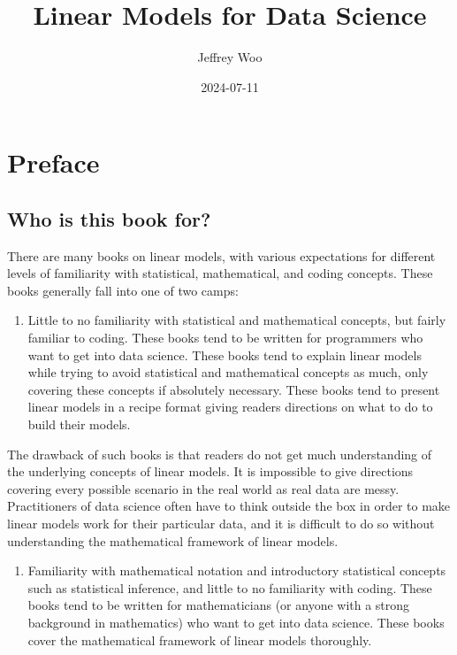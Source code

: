 \documentclass[
]{book}
\title{Linear Models for Data Science}
\author{Jeffrey Woo}
\date{2024-07-11}
\providecommand{\tightlist}{%
  \setlength{\itemsep}{0pt}\setlength{\parskip}{0pt}}
\begin{document}
\maketitle

{
\setcounter{tocdepth}{1}
\tableofcontents
}
\hypertarget{preface}{%
\chapter*{Preface}\label{preface}}

\hypertarget{who-is-this-book-for}{%
\section*{Who is this book for?}\label{who-is-this-book-for}}

There are many books on linear models, with various expectations for different levels of familiarity with statistical, mathematical, and coding concepts. These books generally fall into one of two camps:

\begin{enumerate}
\def\labelenumi{\arabic{enumi}.}
\tightlist
\item
  Little to no familiarity with statistical and mathematical concepts, but fairly familiar to coding. These books tend to be written for programmers who want to get into data science. These books tend to explain linear models while trying to avoid statistical and mathematical concepts as much, only covering these concepts if absolutely necessary. These books tend to present linear models in a recipe format giving readers directions on what to do to build their models.
\end{enumerate}

The drawback of such books is that readers do not get much understanding of the underlying concepts of linear models. It is impossible to give directions covering every possible scenario in the real world as real data are messy. Practitioners of data science often have to think outside the box in order to make linear models work for their particular data, and it is difficult to do so without understanding the mathematical framework of linear models.

\begin{enumerate}
\def\labelenumi{\arabic{enumi}.}
\setcounter{enumi}{1}
\tightlist
\item
  Familiarity with mathematical notation and introductory statistical concepts such as statistical inference, and little to no familiarity with coding. These books tend to be written for mathematicians (or anyone with a strong background in mathematics) who want to get into data science. These books cover the mathematical framework of linear models thoroughly.
\end{enumerate}
\end{document}
